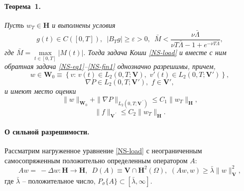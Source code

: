 \documentclass{vzmsthesis}
\begin{document}
\paragraph{Теорема~1.} {\it
Пусть $w_T\in\mathbf{H}$ и выполнены условия
\begin{equation}\label{NS-cond2}
g(t)\in C([0,T]),\,\,\, \left|B_Tg\right|\geq\varepsilon>0,\,\,\, \bar{M}<\frac{\nu \bar{\Lambda}}{\nu T\bar{\Lambda}-1+e^{-\nu T\bar{\Lambda}}},
\end{equation}
где $\bar{M}=\max\limits_{t\in[0,T]}|M(t)|.$
Тогда задача Коши \eqref{NS-load} и вместе с ним обратная задача \eqref{NS-eq1}--\eqref{NS-fin1} однозначно разрешимы, причем,
$$
w\in \mathbf{W}_0\equiv \left\{v:\, v(t)\in L_2(0,T;\mathbf{V}),\,\, v'(t)\in L_2(0,T;\mathbf{V}')\right\},
$$
$$
\nabla P\in L_2(0,T; \mathbf{V}'),\,\, f\in \mathbf{V}',
$$
и имеют место оценки
\begin{equation} \label{NS-est1}
\|w\|_{\mathbf{W}_0}+\|\nabla P\|_{L_2(0,T; \mathbf{V}^{\,'})}\leq C_1\|w_T\|_{\mathbf{H}},
\end{equation}
\begin{equation} \label{NS-est2}
\|f\|_{\mathbf{V}^{\,'}}\leq C_2\|w_T\|_{\mathbf{H}}.
\end{equation}
}

\paragraph{О сильной разрешимости.}
Рассматрим нагруженное уравнение \eqref{NS-load} с неограниченным самосопряженным положительно определенным оператором $A$:
\begin{equation} \label{NS-opA2}
Aw=\ - \Delta w: \mathbf{H}\to\mathbf{H},\,\,\, D(A)\equiv \mathbf{V}\cap \mathbf{H}^2(\Omega),\,\, (Aw,w)\geq\bar{\lambda}\|w\|_{\mathbf{V}}^2,
\end{equation}
где $\bar{\lambda}$ -- положительное число, $P_\sigma\{A\}\subset[\bar{\lambda},\infty].$
\end{document}
